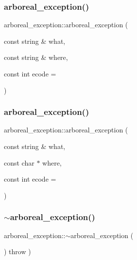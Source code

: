 \subsubsection{\texorpdfstring{arboreal\+\_\+exception()}{arboreal\_exception()}\hspace{0.1cm}{\footnotesize\ttfamily [3/4]}}
{\footnotesize\ttfamily arboreal\+\_\+exception\+::arboreal\+\_\+exception (\begin{DoxyParamCaption}\item[{const string \&}]{what,  }\item[{const string \&}]{where,  }\item[{const int}]{ecode = {} }\end{DoxyParamCaption})}

\mbox{\label{classarboreal__exception_a0a289978d3da4e38cae543c936ddc176}} 
\subsubsection{\texorpdfstring{arboreal\+\_\+exception()}{arboreal\_exception()}\hspace{0.1cm}{\footnotesize\ttfamily [4/4]}}
{\footnotesize\ttfamily arboreal\+\_\+exception\+::arboreal\+\_\+exception (\begin{DoxyParamCaption}\item[{const string \&}]{what,  }\item[{const char $\ast$}]{where,  }\item[{const int}]{ecode = {} }\end{DoxyParamCaption})}

\mbox{\label{classarboreal__exception_a05688a6e400e50ecf14bec2f0c717878}} 
\subsubsection{\texorpdfstring{$\sim$arboreal\+\_\+exception()}{~arboreal\_exception()}}
{\footnotesize\ttfamily arboreal\+\_\+exception\+::$\sim$arboreal\+\_\+exception (\begin{DoxyParamCaption}{ }\end{DoxyParamCaption}) throw  ) }



